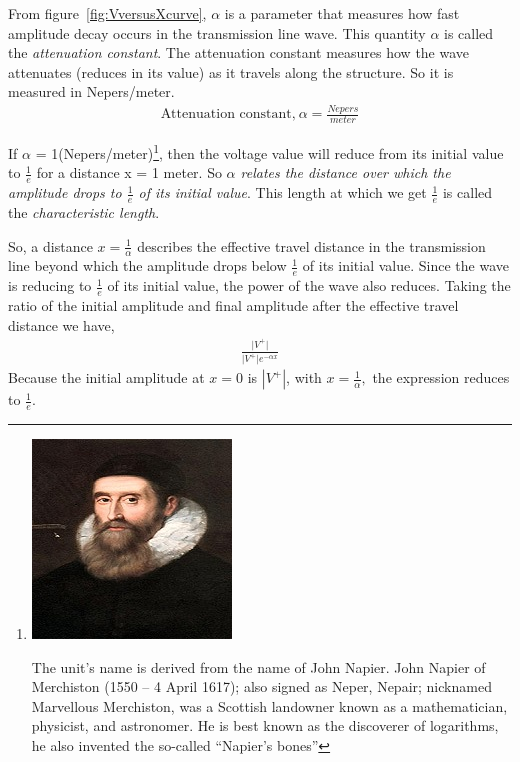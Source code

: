 From figure~\ref{fig:VversusXcurve}, $\alpha$ is a parameter that measures how fast amplitude decay occurs in the transmission line wave. This quantity $\alpha$ is called the \emph{attenuation constant}. The attenuation constant measures how the wave attenuates (reduces in its value) as it travels along the structure. So it is measured in Nepers/meter.
\begin{align*}
\text{Attenuation constant,}\ \alpha = \frac{Nepers}{meter}
\end{align*}

If $\alpha$ = 1(Nepers/meter)\footnote{
\includegraphics[scale=0.2]{./graphics/johnnapier2}

The unit's name is derived from the name of John Napier. John Napier of Merchiston (1550 – 4 April 1617); also signed as Neper, Nepair; nicknamed Marvellous Merchiston, was a Scottish landowner known as a mathematician, physicist, and astronomer. He is best known as the discoverer of logarithms, he also invented the so-called \textquotedblleft Napier's bones\textquotedblright
}, then the voltage value will reduce from its initial value to $\frac{1}{e}$ for a distance x = 1 meter. So \emph{$\alpha$ relates the distance over which the amplitude drops to $\frac{1}{e}$ of its initial value}. This length at which we get $\frac{1}{e}$ is called the \emph{characteristic length}. 

So, a distance $x = \frac{1}{\alpha}$ describes the effective travel distance in the transmission line beyond which the amplitude drops below $\frac{1}{e}$ of its initial value. Since the wave is reducing to $\frac{1}{e}$ of its initial value, the power of the wave also reduces. Taking the ratio of the initial amplitude and final amplitude after the effective travel distance we have,
\begin{align*}
\frac{\lvert V^+\rvert}{\lvert V^+\rvert e ^{-\alpha x}}
\end{align*}
Because the initial amplitude at $x = 0$ is $\left| V^+\right|$, with $x = \frac{1}{\alpha},$ the expression reduces to $\frac{1}{e}$.

